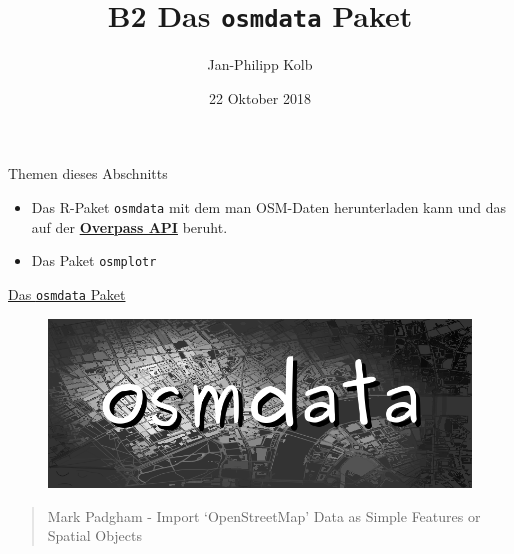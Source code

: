\documentclass[ignorenonframetext,]{beamer}
\title{B2 Das \texttt{osmdata} Paket}
\author{Jan-Philipp Kolb}
\date{22 Oktober 2018}
\begin{document}
\frame{\titlepage}

\begin{frame}[fragile]{Themen dieses Abschnitts}

\begin{itemize}
\item
  Das R-Paket \texttt{osmdata} mit dem man OSM-Daten herunterladen kann
  und das auf der
  \href{https://wiki.openstreetmap.org/wiki/Overpass_API}{\textbf{Overpass
  API}} beruht.
\item
  Das Paket \texttt{osmplotr}
\end{itemize}

\end{frame}

\begin{frame}{\href{https://github.com/ropensci/osmdata}{Das
\texttt{osmdata} Paket}}

\begin{figure}
\centering
\includegraphics{figure/osmdatatitle.png}
\caption{}
\end{figure}

\begin{quote}
Mark Padgham - Import `OpenStreetMap' Data as Simple Features or Spatial
Objects
\end{quote}

\end{frame}
\end{document}
